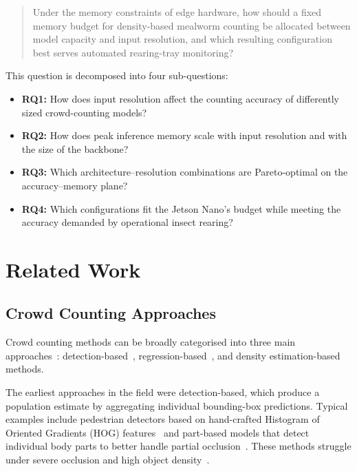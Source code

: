 \documentclass[conference]{IEEEtran}
\begin{document}
\begin{quote}
Under the memory constraints of edge hardware, how should a fixed memory budget
for density-based mealworm counting be allocated between model capacity and
input resolution, and which resulting configuration best serves automated
rearing-tray monitoring?
\end{quote}

\noindent This question is decomposed into four sub-questions:

\begin{itemize}\setlength{\itemsep}{0pt}\setlength{\parskip}{0pt}
  \item \textbf{RQ1:} How does input resolution affect the counting accuracy of
    differently sized crowd-counting models?
  \item \textbf{RQ2:} How does peak inference memory scale with input resolution
    and with the size of the backbone?
  \item \textbf{RQ3:} Which architecture--resolution combinations are
    Pareto-optimal on the accuracy--memory plane?
  \item \textbf{RQ4:} Which configurations fit the Jetson Nano's budget while
    meeting the accuracy demanded by operational insect rearing?
\end{itemize}

\section{Related Work}
\subsection{Crowd Counting Approaches}

Crowd counting methods can be broadly categorised into three main approaches~\cite{gao2020crowdcountingsurvey, li2018csrnet}: detection-based~\cite{dalal2005histograms, felzenszwalb2010object}, regression-based~\cite{chan2008privacy, idrees2013multi}, and density estimation-based~\cite{lempitsky2010learning} methods.

The earliest approaches in the field were detection-based, which produce a population estimate by aggregating individual bounding-box predictions. Typical examples include pedestrian detectors based on hand-crafted Histogram of Oriented Gradients (HOG) features~\cite{dalal2005histograms} and part-based models that detect individual body parts to better handle partial occlusion~\cite{felzenszwalb2010object}. These methods struggle under severe occlusion and high object density~\cite{gao2020crowdcountingsurvey}.
\end{document}
